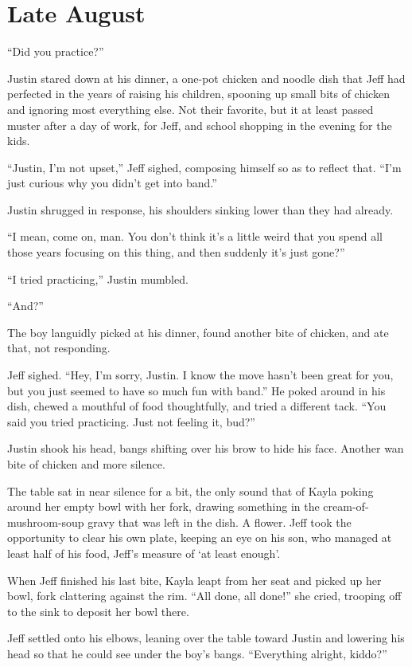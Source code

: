 \chapter{Late August}

``Did you practice?''

Justin stared down at his dinner, a one-pot chicken and noodle dish that Jeff had perfected in the years of raising his children, spooning up small bits of chicken and ignoring most everything else.  Not their favorite, but it at least passed muster after a day of work, for Jeff, and school shopping in the evening for the kids.

``Justin, I'm not upset,'' Jeff sighed, composing himself so as to reflect that.  ``I'm just curious why you didn't get into band.''

Justin shrugged in response, his shoulders sinking lower than they had already.

``I mean, come on, man.  You don't think it's a little weird that you spend all those years focusing on this thing, and then suddenly it's just gone?''

``I tried practicing,'' Justin mumbled.

``And?''

The boy languidly picked at his dinner, found another bite of chicken, and ate that, not responding.

Jeff sighed.  ``Hey, I'm sorry, Justin.  I know the move hasn't been great for you, but you just seemed to have so much fun with band.''  He poked around in his dish, chewed a mouthful of food thoughtfully, and tried a different tack.  ``You said you tried practicing.  Just not feeling it, bud?''

Justin shook his head, bangs shifting over his brow to hide his face.  Another wan bite of chicken and more silence.

The table sat in near silence for a bit, the only sound that of Kayla poking around her empty bowl with her fork, drawing something in the cream-of-mushroom-soup gravy that was left in the dish.  A flower.  Jeff took the opportunity to clear his own plate, keeping an eye on his son, who managed at least half of his food, Jeff's measure of `at least enough'.

When Jeff finished his last bite, Kayla leapt from her seat and picked up her bowl, fork clattering against the rim.  ``All done, all done!'' she cried, trooping off to the sink to deposit her bowl there.

Jeff settled onto his elbows, leaning over the table toward Justin and lowering his head so that he could see under the boy's bangs.  ``Everything alright, kiddo?''

